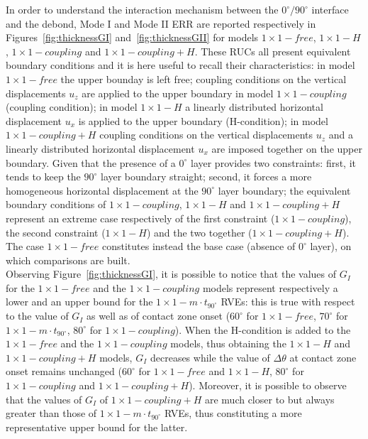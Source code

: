 \documentclass[review]{elsarticle}
\begin{document}
In order to understand the interaction mechanism between the $0^{\circ}/90^{\circ}$ interface and the debond, Mode I and Mode II ERR are reported respectively in Figures~\ref{fig:thicknessGI} and~\ref{fig:thicknessGII} for models $1\times 1-free$, $1\times 1-H$, $1\times 1-coupling$ and $1\times 1-coupling+H$. These RUCs all present equivalent boundary conditions and it is here useful to recall their characteristics: in model $1\times 1-free$ the upper bounday is left free; coupling conditions on the vertical displacements $u_{z}$ are applied to the upper boundary in model $1\times 1-coupling$ (coupling condition); in model $1\times 1-H$ a linearly distributed horizontal displacement $u_{x}$ is applied to the upper boundary (H-condition); in model $1\times 1-coupling+H$ coupling conditions on the vertical displacements $u_{z}$ and a linearly distributed horizontal displacement $u_{x}$ are imposed together on the upper boundary. Given that the presence of a $0^{\circ}$ layer provides two constraints: first, it tends to keep the $90^{\circ}$ layer boundary straight; second, it forces a more homogeneous horizontal displacement at the $90^{\circ}$ layer boundary; the equivalent boundary conditions of $1\times 1-coupling$, $1\times 1-H$ and $1\times 1-coupling+H$ represent an extreme case respectively of the first constraint ($1\times 1-coupling$), the second constraint ($1\times 1-H$) and the two together ($1\times 1-coupling+H$). The case $1\times 1-free$ constitutes instead the base case (absence of $0^{\circ}$ layer), on which comparisons are built.\\
Observing Figure~\ref{fig:thicknessGI}, it is possible to notice that the values of $G_{I}$ for the $1\times 1-free$ and the $1\times 1-coupling$ models represent respectively a lower and an upper bound for the $1\times 1-m\cdot t_{90^{\circ}}$ RVEs: this is true with respect to the value of $G_{I}$ as well as of contact zone onset ($60^{\circ}$ for  $1\times 1-free$, $70^{\circ}$ for $1\times 1-m\cdot t_{90^{\circ}}$, $80^{\circ}$ for $1\times 1-coupling$). When the H-condition is added to the $1\times 1-free$ and the $1\times 1-coupling$ models, thus obtaining the $1\times 1-H$ and $1\times 1-coupling+H$ models, $G_{I}$ decreases while the value of $\Delta\theta$ at contact zone onset remains unchanged ($60^{\circ}$ for  $1\times 1-free$ and $1\times 1-H$, $80^{\circ}$ for $1\times 1-coupling$ and $1\times 1-coupling+H$). Moreover, it is possible to observe that the values of $G_{I}$ of $1\times 1-coupling+H$ are much closer to but always greater than those of $1\times 1-m\cdot t_{90^{\circ}}$ RVEs, thus constituting a more representative upper bound for the latter.\\
\end{document}
